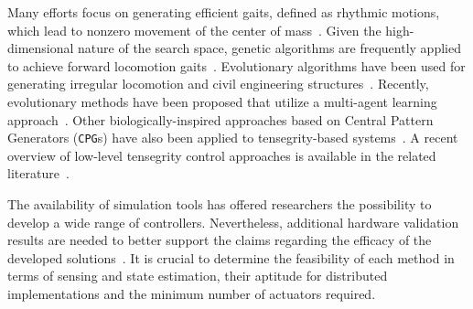 Many efforts focus on generating efficient gaits, defined as rhythmic
motions, which lead to nonzero movement of the center of
mass~\cite{McIsaac:2003kl}.  Given the high-dimensional nature of the
search space, genetic algorithms are frequently applied to achieve
forward locomotion gaits~\cite{Paul2006a}. Evolutionary algorithms
have been used for generating irregular locomotion and civil
engineering structures~\cite{Rieffel2009Automated-Disco,
veuve2015deployment}. Recently, evolutionary methods have been
proposed that utilize a multi-agent learning
approach~\cite{Iscen2013Controlling-Ten}.  Other biologically-inspired
approaches based on Central Pattern Generators ({\tt CPG}s) have also
been applied to tensegrity-based
systems~\cite{Bliss2013Central-Pattern, MirletzSoftRobotics,
Caluwaerts2013rsif}.  A recent overview of low-level tensegrity
control approaches is available in the related literature~\cite[Table
2]{Caluwaerts2013rsif}.





The availability of simulation tools has offered researchers the
possibility to develop a wide range of controllers.  Nevertheless,
additional hardware validation results are needed to better support
the claims regarding the efficacy of the developed
solutions~\cite{Mirletz2015, Caluwaerts2013rsif}.  It is crucial to
determine the feasibility of each method in terms of sensing and state
estimation, their aptitude for distributed implementations and the
minimum number of actuators required.

